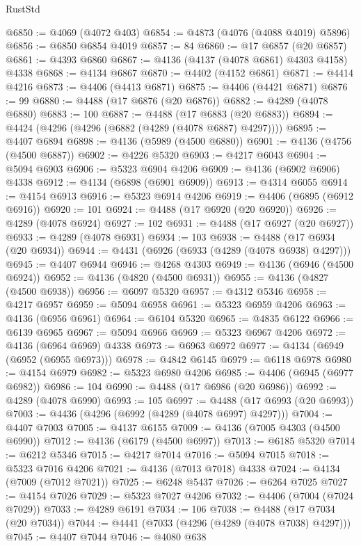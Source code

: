 \begin{lexlean}{RustStd}
\begin{coremodule}
@6850 := @4069 (@4072 @403)
@6854 := @4873 (@4076 (@4088 @4019) @5896)
@6856 := @6850 @6854 @4019
@6857 := 84
@6860 := @17 @6857 (@20 @6857)
@6861 := @4393 @6860
@6867 := @4136 (@4137 (@4078 @6861) @4303 @4158) @4338
@6868 := @4134 @6867
@6870 := @4402 (@4152 @6861)
@6871 := @4414 @4216
@6873 := @4406 (@4413 @6871)
@6875 := @4406 (@4421 @6871)
@6876 := 99
@6880 := @4488 (@17 @6876 (@20 @6876))
@6882 := @4289 (@4078 @6880)
@6883 := 100
@6887 := @4488 (@17 @6883 (@20 @6883))
@6894 := @4424 (@4296 (@4296 (@6882 (@4289 (@4078 @6887) @4297))))
@6895 := @4407 @6894
@6898 := @4136 (@5989 (@4500 @6880))
@6901 := @4136 (@4756 (@4500 @6887))
@6902 := @4226 @5320
@6903 := @4217 @6043
@6904 := @5094 @6903
@6906 := @5323 @6904 @4206
@6909 := @4136 (@6902 @6906) @4338
@6912 := @4134 (@6898 (@6901 @6909))
@6913 := @4314 @6055
@6914 := @4154 @6913
@6916 := @5323 @6914 @4206
@6919 := @4406 (@6895 (@6912 @6916))
@6920 := 101
@6924 := @4488 (@17 @6920 (@20 @6920))
@6926 := @4289 (@4078 @6924)
@6927 := 102
@6931 := @4488 (@17 @6927 (@20 @6927))
@6933 := @4289 (@4078 @6931)
@6934 := 103
@6938 := @4488 (@17 @6934 (@20 @6934))
@6944 := @4431 (@6926 (@6933 (@4289 (@4078 @6938) @4297)))
@6945 := @4407 @6944
@6946 := @4268 @4303
@6949 := @4136 (@6946 (@4500 @6924))
@6952 := @4136 (@4820 (@4500 @6931))
@6955 := @4136 (@4827 (@4500 @6938))
@6956 := @6097 @5320
@6957 := @4312 @5346
@6958 := @4217 @6957
@6959 := @5094 @6958
@6961 := @5323 @6959 @4206
@6963 := @4136 (@6956 @6961)
@6964 := @6104 @5320
@6965 := @4835 @6122
@6966 := @6139 @6965
@6967 := @5094 @6966
@6969 := @5323 @6967 @4206
@6972 := @4136 (@6964 @6969) @4338
@6973 := @6963 @6972
@6977 := @4134 (@6949 (@6952 (@6955 @6973)))
@6978 := @4842 @6145
@6979 := @6118 @6978
@6980 := @4154 @6979
@6982 := @5323 @6980 @4206
@6985 := @4406 (@6945 (@6977 @6982))
@6986 := 104
@6990 := @4488 (@17 @6986 (@20 @6986))
@6992 := @4289 (@4078 @6990)
@6993 := 105
@6997 := @4488 (@17 @6993 (@20 @6993))
@7003 := @4436 (@4296 (@6992 (@4289 (@4078 @6997) @4297)))
@7004 := @4407 @7003
@7005 := @4137 @6155
@7009 := @4136 (@7005 @4303 (@4500 @6990))
@7012 := @4136 (@6179 (@4500 @6997))
@7013 := @6185 @5320
@7014 := @6212 @5346
@7015 := @4217 @7014
@7016 := @5094 @7015
@7018 := @5323 @7016 @4206
@7021 := @4136 (@7013 @7018) @4338
@7024 := @4134 (@7009 (@7012 @7021))
@7025 := @6248 @5437
@7026 := @6264 @7025
@7027 := @4154 @7026
@7029 := @5323 @7027 @4206
@7032 := @4406 (@7004 (@7024 @7029))
@7033 := @4289 @6191
@7034 := 106
@7038 := @4488 (@17 @7034 (@20 @7034))
@7044 := @4441 (@7033 (@4296 (@4289 (@4078 @7038) @4297)))
@7045 := @4407 @7044
@7046 := @4080 @638

\end{coremodule}
\end{lexlean}
